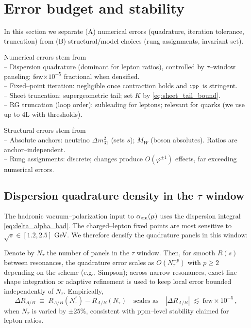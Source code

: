 \documentclass[%
  amsmath,amssymb,
  aps,
 prb,
 floatfix, showkeys
 ]{revtex4-2}
\begin{document}
 \section{Error budget and stability}
 \label{sec:error_stability}
 In this section we separate
 (A) numerical errors (quadrature,  iteration tolerance, truncation) from
 (B) structural/model choices (rung assignments, invariant set).
 
 Numerical errors stem from \\
 -- Dispersion quadrature (dominant for lepton ratios), controlled by $\tau$--window paneling;
 few$\times 10^{-5}$ fractional when densified. \\
 -- Fixed--point iteration: negligible once contraction holds and $\epsilon_{\rm FP}$ is stringent. \\
 -- Sheet truncation: supergeometric tail; set $K$ by \eqref{eq:sheet_tail_bound}. \\
 -- RG truncation (loop order): subleading for leptons; relevant for quarks (we use up to 4L with thresholds). 
 
  Structural errors stem from \\ 
 -- Absolute anchors: neutrino $\Delta m^2_{31}$ (sets $s$); $M_W$ (boson absolutes). Ratios are anchor--independent. \\
 -- Rung assignments: discrete; changes produce $O(\varphi^{\pm 1})$ effects, far exceeding numerical errors.
 
 \subsection{Dispersion quadrature density in the $\tau$ window}
 \label{subsec:error_tau}
 The hadronic vacuum--polarization input to $\alpha_{\rm em}(\mu)$ uses the dispersion integral \eqref{eq:delta_alpha_had}. The charged--lepton fixed points are most sensitive to $\sqrt{s}\in[1.2,2.5]$ GeV.
 We therefore densify the quadrature panels in this window:
 Denote by $N_{\tau}$ the number of panels in the $\tau$ window. Then, for smooth $R(s)$ between resonances, the quadrature error scales as $O(N_{\tau}^{-p})$ with $p$ depending on the scheme (e.g., Simpson); across narrow resonances, exact line–shape integration or adaptive refinement is used to keep local error bounded independently of $N_{\tau}$.
 Empirically,
 \[
   \Delta R_{A/B}\;\equiv\; R_{A/B}(N_{\tau}^\uparrow)-R_{A/B}(N_{\tau})
   \quad\text{scales as}\quad |\Delta R_{A/B}| \;\lesssim\; \mathrm{few}\times10^{-5}\,,
 \]
 when $N_{\tau}$ is varied by $\%$, consistent with ppm--level stability claimed for lepton ratios.
 
\end{document}
